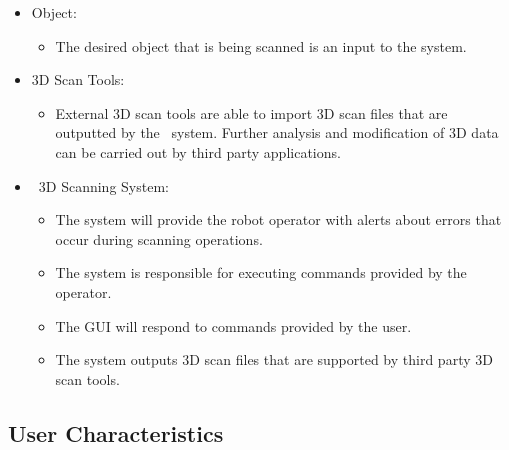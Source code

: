 \documentclass[12pt]{article}
\begin{document}
\begin{itemize}
\item Object:
\begin{itemize}
\item The desired object that is being scanned is an input to the system.
\end{itemize}
\end{itemize}

\begin{itemize}
\item 3D Scan Tools:
\begin{itemize}
\item External 3D scan tools are able to import 3D scan files that are outputted by the \progname\ system. Further analysis and modification of 3D data can be carried out by third party applications.
\end{itemize}
\end{itemize}

\begin{itemize}
\item \progname\ 3D Scanning System:
\begin{itemize}
\item The system will provide the robot operator with alerts about errors that occur during scanning operations.
\item The system is responsible for executing commands provided by the operator.
\item The GUI will respond to commands provided by the user.
\item The system outputs 3D scan files that are supported by third party 3D scan tools.
\end{itemize}
\end{itemize}

\subsection{User Characteristics} \label{SecUserCharacteristics}

  
\end{document}
